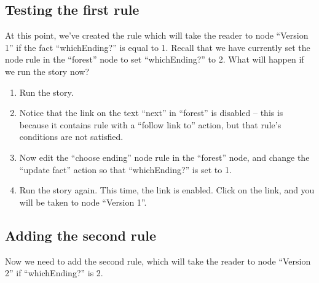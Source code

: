 \documentclass{article}
\begin{document}
\subsection{Testing the first rule}

At this point, we've created the rule which will take the reader to 
node ``Version 1'' if the fact ``whichEnding?'' is equal to 1. Recall 
that we have currently set the node rule in the ``forest'' node to 
set ``whichEnding?'' to 2. What will happen if we run the story now?

\begin{enumerate}
    \item Run the story.
    \item Notice that the link on the text ``next'' in ``forest'' 
    is disabled -- this is because it contains rule with a ``follow link to'' 
    action, but that rule's conditions are not satisfied.
    \item Now edit the ``choose ending'' node rule in the ``forest'' 
    node, and change the ``update fact'' action so that 
    ``whichEnding?'' is set to 1.
    \item Run the story again. This time, the link is enabled. Click 
    on the link, and you will be taken to node ``Version 1''.
\end{enumerate}

\subsection{Adding the second rule}


Now we need to add the second rule, which will take the reader to 
node ``Version 2'' if ``whichEnding?'' is 2.
\end{document}

